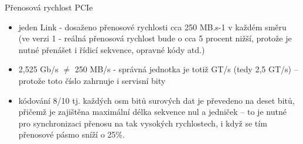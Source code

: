 \documentclass[aspectratio=43]{beamer}
\begin{document}
\begin{frame}{Přenosová rychlost PCIe}
	\begin{itemize}
		\item jeden Link - dosaženo přenosové rychlosti cca 250 MB.s-1 v každém směru (ve verzi 1 - reálná přenosová rychlost bude o cca 5 procent nižší, protože je nutné přenášet i řídicí sekvence, opravné kódy atd.)
		\item 2,525 Gb/s $\neq$ 250 MB/s - správná jednotka je totiž GT/s  (tedy 2,5 GT/s) – protože toto číslo zahrnuje i servisní bity
		\item kódování 8/10 tj. každých osm bitů surových dat je převedeno na deset bitů, přičemž je zajištěna maximální délka sekvence nul a jedniček – to je nutné pro synchronizaci přenosu na tak vysokých rychlostech, i když se tím přenosové pásmo sníží o 25\%.
	\end{itemize}
	
\end{frame}
\end{document}
